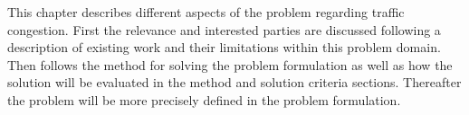 This chapter describes different aspects of the problem regarding traffic congestion. First the relevance and interested parties are discussed following a description of existing work and their limitations within this problem domain. Then follows the method for solving the problem formulation as well as how the solution will be evaluated in the method and solution criteria sections. Thereafter the problem will be more precisely defined in the problem formulation.